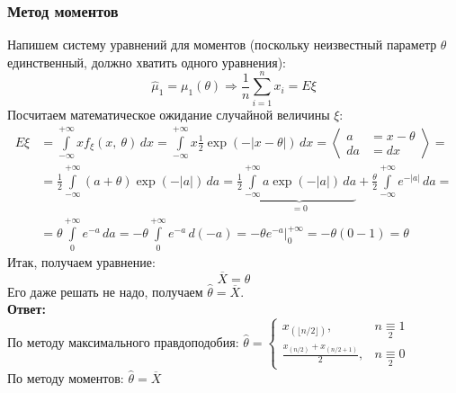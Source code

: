 \documentclass[12pt, a4paper]{article}
\begin{document}
\subsubsection*{Метод моментов}
Напишем систему уравнений для моментов (поскольку неизвестный параметр $\theta$ единственный, должно хватить одного уравнения):
\begin{equation*}
    \hat\mu_1 = \mu_1(\theta)\Rightarrow \frac{1}{n} \sum_{i = 1}^{n} x_i = E\xi
\end{equation*}
Посчитаем математическое ожидание случайной величины $\xi$:
\begin{equation*}
    \begin{aligned}
        E\xi & = \int\limits_{-\infty}^{+\infty} x f_{\xi}(x,\ \theta)\, dx = \int\limits_{-\infty}^{+\infty} x \frac{1}{2}\exp\left( -|x - \theta|\right)\, dx = \left< \begin{aligned}
                                                                                                                                                                             a  & = x - \theta \\
                                                                                                                                                                             da & = dx
                                                                                                                                                                         \end{aligned}  \right> =                                                   \\
             & = \frac{1}{2}\int\limits_{-\infty}^{+\infty} (a + \theta)\exp(-|a|)\, da = \frac{1}{2} \underset{=0}{\underbrace{\int\limits_{-\infty}^{+\infty}a\exp(-|a|)\, da}} + \frac{\theta}{2}\int\limits_{-\infty}^{+\infty} e^{-|a|}\, da = \\
             & = \theta \int\limits_{0}^{+\infty} e^{-a}\, da = -\theta \int\limits_0^{+\infty} e^{-a}\, d(-a) = -\theta e^{-a}\Big|_0^{+\infty} = -\theta (0 - 1) = \theta
    \end{aligned}
\end{equation*}
Итак, получаем уравнение:
\begin{equation*}
    \overline{X} = \theta
\end{equation*}
Его даже решать не надо, получаем $\hat\theta = \overline{X}$.\\

\textbf{Ответ:}\\
По методу максимального правдоподобия: $\hat \theta = \begin{cases}
        x_{(\lfloor n/2 \rfloor)},           & n\underset{2}{\equiv} 1 \\
        \frac{x_{(n/2)} + x_{(n/2 + 1)}}{2}, & n\underset{2}{\equiv} 0
    \end{cases}$\\
По методу моментов: $\hat \theta = \overline{X}$
\end{document}
